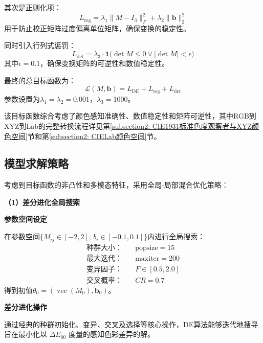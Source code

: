 其次是正则化项：
\begin{equation}
L_{\mathrm{reg}}=\lambda_1\|M-I_3\|_F^2+\lambda_2\|\mathbf{b}\|_2^2
\end{equation}
用于防止校正矩阵过度偏离单位矩阵，确保变换的稳定性。

同时引入行列式惩罚：
\begin{equation}
L_{\det}=\lambda_3 \cdot \mathbf{1}\bigl(\det M\leq0 \lor |\det M|<\epsilon\bigr)
\end{equation}
其中$\epsilon=0.1$，确保变换矩阵的可逆性和数值稳定性。

最终的总目标函数为：
\begin{equation}
\mathcal{L}(M,\mathbf{b})=L_{\mathrm{DE}}+L_{\mathrm{reg}}+L_{\det}
\end{equation}
参数设置为$\lambda_1=\lambda_2=0.001$，$\lambda_3=1000$。

该目标函数综合考虑了颜色感知准确性、数值稳定性和矩阵可逆性，其中RGB到XYZ到Lab的完整转换流程详见第\ref{subsection2: CIE1931标准色度观察者与XYZ颜色空间}节和第\ref{subsection2: CIELab颜色空间}节。

\subsection[\hspace{-2pt}模型求解策略]{{\heiti{}\hspace{-8pt}模型求解策略}}\label{subsec:3-solver}

考虑到目标函数的非凸性和多模态特征，采用全局-局部混合优化策略：

\noindent\textbf{（1）差分进化全局搜索}

 \textbf{参数空间设定}

在参数空间$\{M_{ij}\in[-2,2],\,b_i\in[-0.1,0.1]\}$内进行全局搜索：
\begin{align}
  \text{种群大小：} &\quad \text{popsize} = 15\\
  \text{最大迭代：} &\quad \text{maxiter} = 200\\
  \text{变异因子：} &\quad F \in [0.5, 2.0]\\
  \text{交叉概率：} &\quad CR = 0.7
\end{align}
得到初值$\theta_0=(\operatorname{vec}(M_0),\mathbf{b}_0)$。

 \textbf{差分进化操作}

通过经典的种群初始化、变异、交叉及选择等核心操作，DE算法能够迭代地搜寻旨在最小化以 $\Delta E_{00}$ 度量的感知色彩差异的解。

